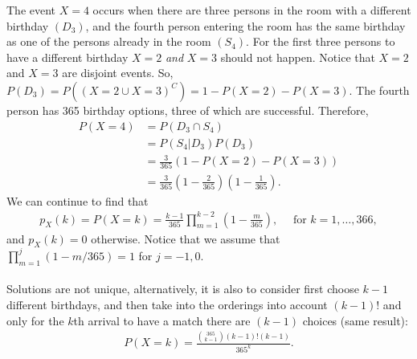 \begin{exercise}[BH.3.1]
\begin{solution}
	The event $X=4$ occurs when there are three persons in the room with a different birthday $(D_{3})$, and the fourth person entering the room has the same birthday as one of the persons already in the room $(S_{4})$. For the first three persons to have a different birthday $X=2$ \textit{and} $X=3$ should not happen. Notice that $X=2$ and $X=3$ are disjoint events. So, $P(D_{3}) = P((X=2\cup X=3)^{C}) = 1-P(X=2)-P(X=3)$.   The fourth person has 365 birthday options, three of which are successful. Therefore,
	\begin{align*}
		P(X=4) &= P(D_{3} \cap S_{4})\\
		& = P(S_{4}|D_{3})P(D_{3})\\
		& = \frac{3}{365}(1-P(X=2)-P(X=3))\\
		& = \frac{3}{365}\left(1-\frac{2}{365}\right)\left(1-\frac{1}{365}\right).
	\end{align*}
	We can continue to find that 
	\begin{align*}
		p_{X}(k) = P(X=k) = \frac{k-1}{365}\prod_{m=1}^{k-2}\left(1-\frac{m}{365}\right), \quad \text{ for } k = 1,\ldots,366,
	\end{align*}
	and $p_{X}(k)= 0$ otherwise. Notice that we assume that $\prod_{m=1}^{j}(1-m/365)=1$ for $j=-1,0$.\\~\\
	Solutions are not unique, alternatively, it is also to consider first choose $k-1$ different birthdays, and then take into the orderings into account $(k-1)!$ and only for the $k$th arrival to have a match there are $(k-1)$ choices (same result):
	\begin{align*}
	P(X=k)= \frac{{365\choose k-1}(k-1)!(k-1) }{365^k}.
	\end{align*}
\end{solution}
\end{exercise}

